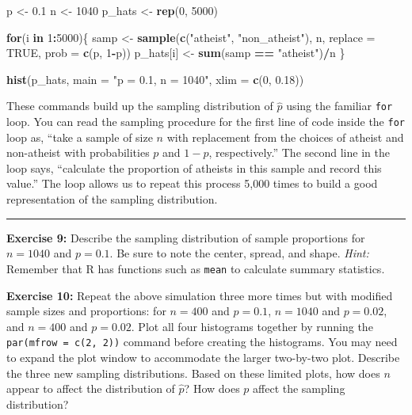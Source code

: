 \documentclass[]{book}
\newenvironment{Shaded}{\begin{snugshade}}{\end{snugshade}}
\newcommand{\KeywordTok}[1]{\textcolor[rgb]{0.13,0.29,0.53}{\textbf{#1}}}
\newcommand{\DataTypeTok}[1]{\textcolor[rgb]{0.13,0.29,0.53}{#1}}
\newcommand{\DecValTok}[1]{\textcolor[rgb]{0.00,0.00,0.81}{#1}}
\newcommand{\FloatTok}[1]{\textcolor[rgb]{0.00,0.00,0.81}{#1}}
\newcommand{\StringTok}[1]{\textcolor[rgb]{0.31,0.60,0.02}{#1}}
\newcommand{\OtherTok}[1]{\textcolor[rgb]{0.56,0.35,0.01}{#1}}
\newcommand{\ControlFlowTok}[1]{\textcolor[rgb]{0.13,0.29,0.53}{\textbf{#1}}}
\newcommand{\OperatorTok}[1]{\textcolor[rgb]{0.81,0.36,0.00}{\textbf{#1}}}
\newcommand{\NormalTok}[1]{#1}
\theoremstyle{definition}
\theoremstyle{definition}
\theoremstyle{definition}
\theoremstyle{remark}
\begin{document}
\begin{Shaded}
\begin{Highlighting}[]
\NormalTok{p <-}\StringTok{ }\FloatTok{0.1}
\NormalTok{n <-}\StringTok{ }\DecValTok{1040}
\NormalTok{p_hats <-}\StringTok{ }\KeywordTok{rep}\NormalTok{(}\DecValTok{0}\NormalTok{, }\DecValTok{5000}\NormalTok{)}

\ControlFlowTok{for}\NormalTok{(i }\ControlFlowTok{in} \DecValTok{1}\OperatorTok{:}\DecValTok{5000}\NormalTok{)\{}
\NormalTok{  samp <-}\StringTok{ }\KeywordTok{sample}\NormalTok{(}\KeywordTok{c}\NormalTok{(}\StringTok{"atheist"}\NormalTok{, }\StringTok{"non_atheist"}\NormalTok{), n, }\DataTypeTok{replace =} \OtherTok{TRUE}\NormalTok{, }\DataTypeTok{prob =} \KeywordTok{c}\NormalTok{(p, }\DecValTok{1}\OperatorTok{-}\NormalTok{p))}
\NormalTok{  p_hats[i] <-}\StringTok{ }\KeywordTok{sum}\NormalTok{(samp }\OperatorTok{==}\StringTok{ "atheist"}\NormalTok{)}\OperatorTok{/}\NormalTok{n}
\NormalTok{\}}

\KeywordTok{hist}\NormalTok{(p_hats, }\DataTypeTok{main =} \StringTok{"p = 0.1, n = 1040"}\NormalTok{, }\DataTypeTok{xlim =} \KeywordTok{c}\NormalTok{(}\DecValTok{0}\NormalTok{, }\FloatTok{0.18}\NormalTok{))}
\end{Highlighting}
\end{Shaded}

These commands build up the sampling distribution of \(\hat{p}\) using
the familiar \texttt{for} loop. You can read the sampling procedure for
the first line of code inside the \texttt{for} loop as, ``take a sample
of size \(n\) with replacement from the choices of atheist and
non-atheist with probabilities \(p\) and \(1 - p\), respectively.'' The
second line in the loop says, ``calculate the proportion of atheists in
this sample and record this value.'' The loop allows us to repeat this
process 5,000 times to build a good representation of the sampling
distribution.

\begin{center}\rule{0.5\linewidth}{\linethickness}\end{center}

\textbf{Exercise 9:} Describe the sampling distribution of sample
proportions for \(n = 1040\) and \(p = 0.1\). Be sure to note the
center, spread, and shape. \emph{Hint:} Remember that R has functions
such as \texttt{mean} to calculate summary statistics.

\textbf{Exercise 10:} Repeat the above simulation three more times but
with modified sample sizes and proportions: for \(n = 400\) and
\(p = 0.1\), \(n = 1040\) and \(p = 0.02\), and \(n = 400\) and
\(p = 0.02\). Plot all four histograms together by running the
\texttt{par(mfrow\ =\ c(2,\ 2))} command before creating the histograms.
You may need to expand the plot window to accommodate the larger
two-by-two plot. Describe the three new sampling distributions. Based on
these limited plots, how does \(n\) appear to affect the distribution of
\(\hat{p}\)? How does \(p\) affect the sampling distribution?
\end{document}
